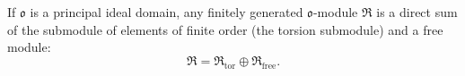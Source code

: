 If $\mathfrak{o}$ is a principal ideal domain, any finitely generated $\mathfrak{o}$-module $\mathfrak{R}$ is a direct sum of the submodule of elements of finite order (the torsion submodule) and a free module:
$$\mathfrak{R} = \mathfrak{R}_{\text{tor}} \oplus \mathfrak{R}_{\text{free}}.$$
